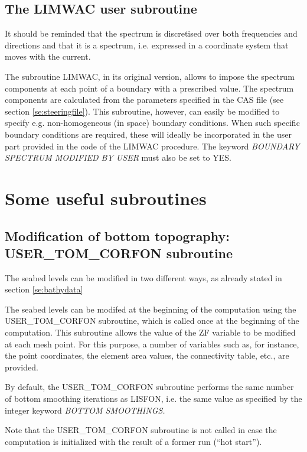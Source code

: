 \subsection{ The LIMWAC user subroutine}

 It should be reminded that the spectrum is discretised over both frequencies and directions and that it is a  spectrum, i.e. expressed in a coordinate system that moves with the current.

 The subroutine LIMWAC, in its original version, allows to impose the spectrum components at each point of a boundary with a prescribed value. The spectrum components are calculated from the parameters specified in the CAS file (see section \ref{se:steeringfile}). This subroutine, however, can easily be modified to specify e.g. non-homogeneous (in space) boundary conditions. When such specific boundary conditions are required, these will ideally be incorporated in the user part provided in the code of the LIMWAC procedure. The keyword \textit{BOUNDARY SPECTRUM MODIFIED BY USER} must also be set to YES.


\section{ Some useful subroutines}


\subsection{ Modification of bottom topography: USER\_TOM\_CORFON subroutine}
\label{se:corfon}
 The seabed levels can be modified in two different ways, as already stated in section \ref{se:bathydata}

 The seabed levels can be modifed at the beginning of the computation using the USER\_TOM\_CORFON subroutine, which is called once at the beginning of the computation. This subroutine allows the value of the ZF variable to be modified at each mesh point. For this purpose, a number of variables such as, for instance, the point coordinates, the element area values, the connectivity table, etc., are provided.

 By default, the USER\_TOM\_CORFON subroutine performs the same number of bottom smoothing iterations as LISFON, i.e. the same value as specified by the integer keyword \textit{BOTTOM SMOOTHINGS.}

 Note that the USER\_TOM\_CORFON subroutine is not called in case the computation is initialized with the result of a former \tomawac run (``hot start'').

